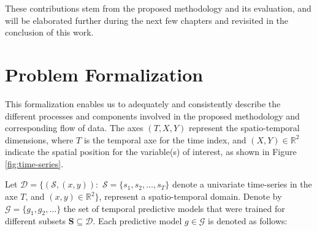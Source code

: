  
These contributions stem from the proposed methodology and its evaluation, and will be elaborated further during the next few chapters and revisited in the conclusion of this work.

\section{Problem Formalization}
\label{Sec:ProblemFormalization}

This formalization enables us to adequately and consistently describe the different processes and components involved in the proposed methodology and corresponding flow of data. The axes $\left(T, X, Y\right)$ represent the spatio-temporal dimensions, where $T$ is the temporal axe for the time index, and $(X,Y) \in \mathbb{R}^{2}$ indicate the spatial position for the variable(s) of interest, as shown in Figure \ref{fig:time-series}.

Let $\mathcal{D} = \{(\mathcal{S},( x, y)): \,\, \mathcal{S} = \{s_{1}, s_{2}, \ldots, s_{T}\}$ denote a univariate time-series in the axe $T$, and $(x,y) \in \mathbb{R}^{2}\}$, represent a spatio-temporal domain. Denote by $\mathcal{G} = \{g_{1}, g_{2}, \ldots \}$ the set of temporal predictive models that were trained for different subsets $\mathbf{S} \subseteq \mathcal{D}$. Each predictive model $g\in \mathcal{G}$ is denoted as follows:

